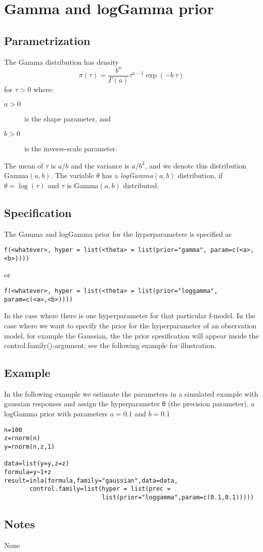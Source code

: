\documentclass[a4paper,11pt]{article}
\begin{document}
\section*{Gamma and logGamma prior}

\subsection*{Parametrization}
The Gamma  distribution has density
\begin{equation}
    \pi(\tau)=\frac{b^a}{\Gamma(a)}\tau^{a-1}\exp(-b\ \tau)
\end{equation}
for $\tau>0$ where:
\begin{description}
\item[$a>0$] is the shape parameter, and
\item[$b>0$] is the inverse-scale parameter.
\end{description}
The mean of $\tau$ is $a/b$ and the variance is $a/b^2$, and we denote
this distribution Gamma$(a,b)$. The variable $\theta$ has a
\emph{logGamma}$(a,b)$ distribution, if $\theta=\log(\tau)$ and $\tau$
is Gamma$(a,b)$ distributed.

\subsection*{Specification}
The Gamma and logGamma prior for the hyperparameters is specified as
\begin{center}
    {\tt f(<whatever>, hyper = list(<theta> =
        list(prior="gamma", param=c(<a>,<b>))))}
\end{center}
or
\begin{center}
    {\tt f(<whatever>, hyper = list(<theta> =
        list(prior="loggamma", param=c(<a>,<b>))))}
\end{center}
In the case where there is one hyperparameter for that particular
f-model. In the case where we want to specify the prior for the
hyperparameter of an observation model, for example the Gaussian, the
the prior spesification will appear inside the
control.family()-argument; see the following example for illustration.

\subsection*{Example}

In the following example we estimate the parameters in a simulated
example with gaussian responses and assign the hyperparameter θ (the
precision parameter), a logGamma prior with parameters $a=0.1$ and
$b=0.1$


\begin{verbatim}
n=100
z=rnorm(n)
y=rnorm(n,z,1)

data=list(y=y,z=z)
formula=y~1+z
result=inla(formula,family="gaussian",data=data,
       control.family=list(hyper = list(prec =
                           list(prior="loggamma",param=c(0.1,0.1)))))
\end{verbatim}

\subsection*{Notes}
None
\end{document}
